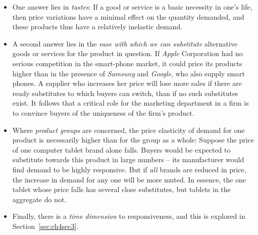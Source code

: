 \begin{itemize}
\item One answer lies in \textit{tastes}: If a good or service is a basic
necessity in one's life, then price variations have a minimal effect on the
quantity demanded, and these products thus have a relatively inelastic
demand.

\item A second answer lies in the \textit{ease with which we can substitute}
alternative goods or services for the product in question. If \textit{Apple}
Corporation had no serious competition in the smart-phone market, it could
price its products higher than in the presence of \textit{Samsung} and \textit{Google},
who also supply smart phones. A supplier who increases her price will lose
more sales if there are ready substitutes to which buyers can switch, than
if no such substitutes exist. It follows that a critical role for the
marketing department in a firm is to convince buyers of the uniqueness of
the firm's product.

\item Where \textit{product groups} are concerned, the price elasticity of
demand for one product is necessarily higher than for the group as a whole:
Suppose the price of one computer tablet brand alone falls. Buyers would be
expected to substitute towards this product in large numbers -- its
manufacturer would find demand to be highly responsive. But if \textit{all}
brands are reduced in price, the increase in demand for any one will be more
muted. In essence, the one tablet whose price falls has several close
substitutes, but tablets in the aggregate do not.

\item Finally, there is a \textit{time dimension} to responsiveness, and
this is explored in Section~\ref{sec:ch4sec3}.
\end{itemize}